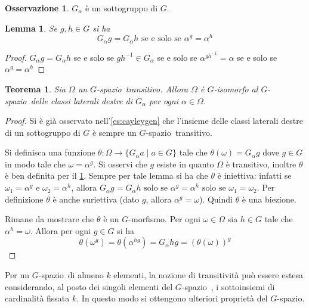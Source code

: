 \documentclass[12pt,a4paper,openright]{report}
\newcommand{\0}{\setminus\{0\}} %
\newcommand{\Gsp}{$G$-spazio~} %
\newcommand{\stab}[1]{G_{#1}}   %
\theoremstyle{definition}
\newtheorem{oss}[defn]{Osservazione}
\theoremstyle{plain}
\newtheorem{theo}[defn]{Teorema}
\newtheorem{lem}[defn]{Lemma}
\begin{document}
\begin{oss}
$\stab{\alpha}$ è un sottogruppo di $G$.
\end{oss}

\begin{lem} \label{lem:lemma34}
Se $g,h \in G$ si ha \[\stab{\alpha}g=\stab{\alpha}h \mbox{ se e solo se } \alpha^g=\alpha^h\]
\end{lem}
\begin{proof}
$\stab{\alpha}g=\stab{\alpha}h$ se e solo se $gh^{-1} \in \stab{\alpha}$ se e solo se $\alpha^{gh^{-1}}=\alpha$ se e solo se $\alpha^g=\alpha^h$
\end{proof}
\begin{theo}
Sia $\Omega$ un \Gsp transitivo. Allora $\Omega$ è $G$-isomorfo al \Gsp delle classi laterali destre di $\stab{\alpha}$ per ogni $\alpha \in \Omega$.
\end{theo}
\begin{proof}
Si è già osservato nell'\cref{es:cayleygen} che l'insieme delle classi laterali destre di un sottogruppo di $G$ è sempre un \Gsp transitivo.

Si definisca una funzione $\theta : \Omega \rightarrow \{\stab{\alpha}a \mid a \in G\}$ tale che $\theta (\omega)=\stab{\alpha}g$ dove $g \in G$ in modo tale che $\omega=\alpha^g$. Si osservi che $g$ esiste in quanto $\Omega$ è transitivo, inoltre $\theta$ è ben definita per il \cref{lem:lemma34}. Sempre per tale lemma si ha che $\theta$ è iniettiva: infatti se $\omega_1=\alpha^g$ e $\omega_2=\alpha^h$, allora $\stab{\alpha}g=\stab{\alpha}h \mbox{ solo se } \alpha^g=\alpha^h \mbox{ solo se } \omega_1=\omega_2$. Per definizione $\theta$ è anche suriettiva (dato $g$, allora $\alpha^g=\omega$). Quindi $\theta$ è una biezione.

Rimane da mostrare che $\theta$ è un $G$-morfismo. Per ogni $\omega \in \Omega$ sia $h \in G$ tale che $\alpha^h=\omega$. Allora per ogni $g \in G$ si ha \[\theta(\omega^g)=\theta(\alpha^{hg})=\stab{\alpha}hg=(\theta(\omega))^g\]
\end{proof}

Per un \Gsp di almeno $k$ elementi, la nozione di transitività può essere estesa
considerando, al posto dei singoli elementi del \Gsp, i sottoinsiemi di cardinalità fissata $k$. In questo modo si ottengono ulteriori proprietà del $G$-spazio.
\end{document}
